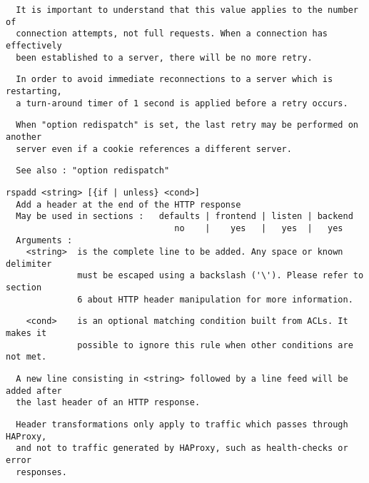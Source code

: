 \begin{verbatim}
  It is important to understand that this value applies to the number of
  connection attempts, not full requests. When a connection has effectively
  been established to a server, there will be no more retry.
\end{verbatim}

\begin{verbatim}
  In order to avoid immediate reconnections to a server which is restarting,
  a turn-around timer of 1 second is applied before a retry occurs.
\end{verbatim}

\begin{verbatim}
  When "option redispatch" is set, the last retry may be performed on another
  server even if a cookie references a different server.
\end{verbatim}

\begin{verbatim}
  See also : "option redispatch"
\end{verbatim}

\begin{verbatim}
rspadd <string> [{if | unless} <cond>]
  Add a header at the end of the HTTP response
  May be used in sections :   defaults | frontend | listen | backend
                                 no    |    yes   |   yes  |   yes
  Arguments :
    <string>  is the complete line to be added. Any space or known delimiter
              must be escaped using a backslash ('\'). Please refer to section
              6 about HTTP header manipulation for more information.
\end{verbatim}

\begin{verbatim}
    <cond>    is an optional matching condition built from ACLs. It makes it
              possible to ignore this rule when other conditions are not met.
\end{verbatim}

\begin{verbatim}
  A new line consisting in <string> followed by a line feed will be added after
  the last header of an HTTP response.
\end{verbatim}

\begin{verbatim}
  Header transformations only apply to traffic which passes through HAProxy,
  and not to traffic generated by HAProxy, such as health-checks or error
  responses.
\end{verbatim}

